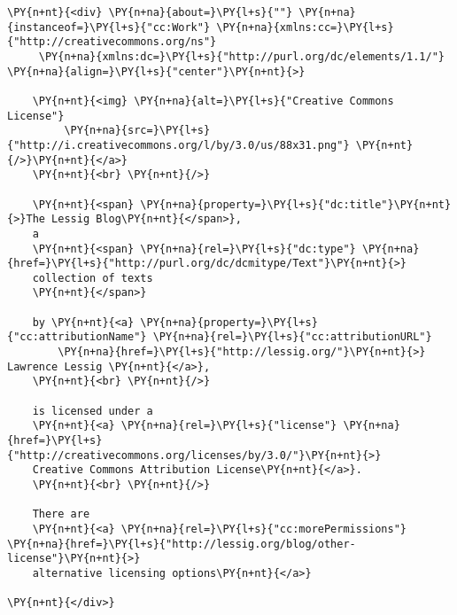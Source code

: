 \begin{Verbatim}[commandchars=\\\{\}]
\PY{n+nt}{<div} \PY{n+na}{about=}\PY{l+s}{""} \PY{n+na}{instanceof=}\PY{l+s}{"cc:Work"} \PY{n+na}{xmlns:cc=}\PY{l+s}{"http://creativecommons.org/ns"}
     \PY{n+na}{xmlns:dc=}\PY{l+s}{"http://purl.org/dc/elements/1.1/"} \PY{n+na}{align=}\PY{l+s}{"center"}\PY{n+nt}{>}

    \PY{n+nt}{<img} \PY{n+na}{alt=}\PY{l+s}{"Creative Commons License"}
         \PY{n+na}{src=}\PY{l+s}{"http://i.creativecommons.org/l/by/3.0/us/88x31.png"} \PY{n+nt}{/>}\PY{n+nt}{</a>}
    \PY{n+nt}{<br} \PY{n+nt}{/>}

    \PY{n+nt}{<span} \PY{n+na}{property=}\PY{l+s}{"dc:title"}\PY{n+nt}{>}The Lessig Blog\PY{n+nt}{</span>},
    a
    \PY{n+nt}{<span} \PY{n+na}{rel=}\PY{l+s}{"dc:type"} \PY{n+na}{href=}\PY{l+s}{"http://purl.org/dc/dcmitype/Text"}\PY{n+nt}{>}
    collection of texts
    \PY{n+nt}{</span>}

    by \PY{n+nt}{<a} \PY{n+na}{property=}\PY{l+s}{"cc:attributionName"} \PY{n+na}{rel=}\PY{l+s}{"cc:attributionURL"}
        \PY{n+na}{href=}\PY{l+s}{"http://lessig.org/"}\PY{n+nt}{>} Lawrence Lessig \PY{n+nt}{</a>},
    \PY{n+nt}{<br} \PY{n+nt}{/>}

    is licensed under a
    \PY{n+nt}{<a} \PY{n+na}{rel=}\PY{l+s}{"license"} \PY{n+na}{href=}\PY{l+s}{"http://creativecommons.org/licenses/by/3.0/"}\PY{n+nt}{>}
    Creative Commons Attribution License\PY{n+nt}{</a>}.
    \PY{n+nt}{<br} \PY{n+nt}{/>}

    There are
    \PY{n+nt}{<a} \PY{n+na}{rel=}\PY{l+s}{"cc:morePermissions"} \PY{n+na}{href=}\PY{l+s}{"http://lessig.org/blog/other-license"}\PY{n+nt}{>}
    alternative licensing options\PY{n+nt}{</a>}

\PY{n+nt}{</div>}
\end{Verbatim}
